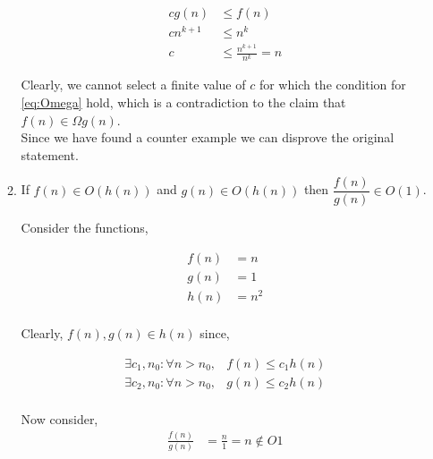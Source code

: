 \begin{enumerate}
\begin{enumerate}
                    \begin{align*}
                        c g \left( n \right) & \le f \left(n \right)         \\
                        c n^{k + 1}          & \le n^k                       \\
                        c                    & \le \frac{n^{k + 1}}{n^k} = n
                    \end{align*}

                    Clearly, we cannot select a finite value of $c$ for which the condition for \ref{eq:Omega} hold, which is
                    a contradiction to the claim that $f \left( n \right) \in \Omega g \left( n \right)$. \\

                    Since we have found a counter example we can disprove the original statement. \\

              \item If $f(n) \in O(h(n))$ and $g(n) \in O(h(n))$ then $\dfrac{f(n)}{g(n)} \in O(1)$.

                    Consider the functions,

                    \begin{align*}
                        f\left(n\right) & = n   \\
                        g\left(n\right) & = 1   \\
                        h\left(n\right) & = n^2 \\
                    \end{align*}

                    Clearly, $f(n), g(n) \in h(n)$ since,

                    \begin{align*}
                        \exists c_1, n_0 : \forall n > n_0, & f\left(n\right) \le c_1 h\left(n\right) \\
                        \exists c_2, n_0 : \forall n > n_0, & g\left(n\right) \le c_2 h\left(n\right) \\
                    \end{align*}

                    Now consider,
                    \begin{align*}
                        \frac{f\left(n\right)}{g\left(n\right)} & = \frac{n}{1} = n \notin O{1}
                    \end{align*}


\end{enumerate}
\end{enumerate}
